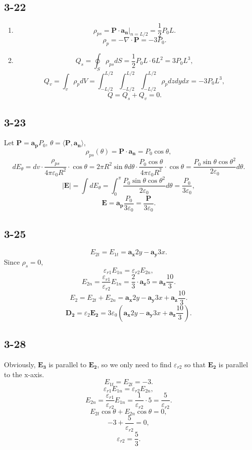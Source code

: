\documentclass[11pt,a4paper]{article}
\author{\href{liuyh615@sjtu.edu.cn}{Yihao Liu} (515370910207)}
\subtitle{Homework}
\begin{document}
\maketitle

\subsection{3-22}
\begin{enumerate}[label=\alph*)]
\item 
$$\rho_{ps}=\mathbf{P}\cdot\mathbf{a_n}|_{n=L/2}=\frac{1}{2}P_0L.$$
$$\rho_p=-\nabla\cdot\mathbf{P}=-3P_0.$$
\item
$$Q_s=\oint_S\rho_{ps}dS=\frac{1}{2}P_0L\cdot 6L^2=3P_0L^3,$$
$$Q_v=\int_v\rho_pdV=\int_{-L/2}^{L/2}\int_{-L/2}^{L/2}\int_{-L/2}^{L/2}\rho_pdzdydx=-3P_0L^3,$$
$$Q=Q_s+Q_v=0.$$
\end{enumerate}

\subsection{3-23}
Let $\mathbf{P}=\mathbf{a_p}P_0$, $\theta=\langle \mathbf{P},\mathbf{a_n} \rangle$,
$$\rho_{ps}(\theta)=\mathbf{P}\cdot\mathbf{a_n}=P_0\cos\theta,$$
$$dE_\theta=dv\cdot\frac{\rho_{ps}}{4\pi\varepsilon_0R^2}\cdot\cos\theta=2\pi R^2\sin\theta d\theta\cdot\frac{P_0\cos\theta}{4\pi\varepsilon_0R^2}\cdot\cos\theta=\frac{P_0\sin\theta\cos\theta^2}{2\varepsilon_0}d\theta.$$
$$|\mathbf{E}|=\int dE_\theta=\int_0^\pi\frac{P_0\sin\theta\cos\theta^2}{2\varepsilon_0}d\theta=\frac{P_0}{3\varepsilon_0},$$
$$\mathbf{E}=\mathbf{a_p}\frac{P_0}{3\varepsilon_0}=\frac{\mathbf{P}}{3\varepsilon_0}.$$

\subsection{3-25}
$$E_{2t}=E_{1t}=\mathbf{a_x}2y-\mathbf{a_y}3x.$$
Since $\rho_s=0$,
$$\varepsilon_{r1}E_{1n}=\varepsilon_{r2}E_{2n},$$
$$E_{2n}=\frac{\varepsilon_{r1}}{\varepsilon_{r2}}E_{1n}=\frac{2}{3}\cdot\mathbf{a_z}5=\mathbf{a_z}\frac{10}{3}.$$
$$E_2=E_{2t}+E_{2n}=\mathbf{a_x}2y-\mathbf{a_y}3x+\mathbf{a_z}\frac{10}{3}.$$
$$\mathbf{D_2}=\varepsilon_2\mathbf{E_2}=3\varepsilon_0\left(\mathbf{a_x}2y-\mathbf{a_y}3x+\mathbf{a_z}\frac{10}{3}\right).$$

\subsection{3-28}
Obviously, $\mathbf{E_3}$ is parallel to $\mathbf{E_2}$, so we only need to find $\varepsilon_{r2}$ so that $\mathbf{E_2}$ is parallel to  the x-axis.
$$E_{1t}=E_{2t}=-3.$$
$$\varepsilon_{r1}E_{1n}=\varepsilon_{r2}E_{2n},$$
$$E_{2n}=\frac{\varepsilon_{r1}}{\varepsilon_{r2}}E_{1n}=\frac{1}{\varepsilon_{r2}}\cdot5=\frac{5}{\varepsilon_{r2}}.$$
$$E_{2t}\cos\theta+E_{2n}\cos\theta=0,$$
$$-3+\frac{5}{\varepsilon_{r2}}=0,$$
$$\varepsilon_{r2}=\frac{5}{3}.$$
\end{document}
